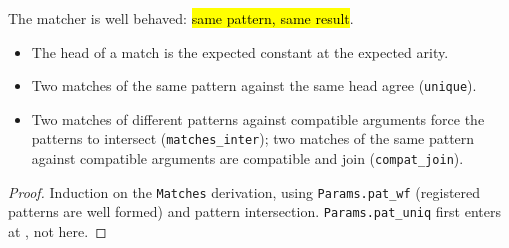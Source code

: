 \begin{lemma}
\label{thm:expa-le-interp-matches}
\leanok
{}

 The matcher is well behaved: \hl{same pattern, same result}.
\begin{itemize}
\item The head of a match is the expected constant at the expected arity.
\item Two matches of the same pattern against the same head agree (\texttt{unique}).
\item Two matches of different patterns against compatible arguments force the patterns to intersect
(\texttt{matches\_inter}); two matches of the same pattern against compatible arguments are
compatible and join (\texttt{compat\_join}).
\end{itemize}
\end{lemma}
\begin{proof}
\leanok
{} Induction on the \texttt{Matches} derivation, using \texttt{Params.pat\_wf} (registered
patterns are well formed) and pattern intersection. \texttt{Params.pat\_uniq} first enters at
, not here.
\end{proof}

